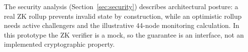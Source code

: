The security analysis (Section~\ref{sec:security}) describes architectural posture: a real ZK rollup prevents invalid state by construction, while an optimistic rollup needs active challengers and the illustrative 44-node monitoring calculation. In this prototype the ZK verifier is a mock, so the guarantee is an interface, not an implemented cryptographic property.
